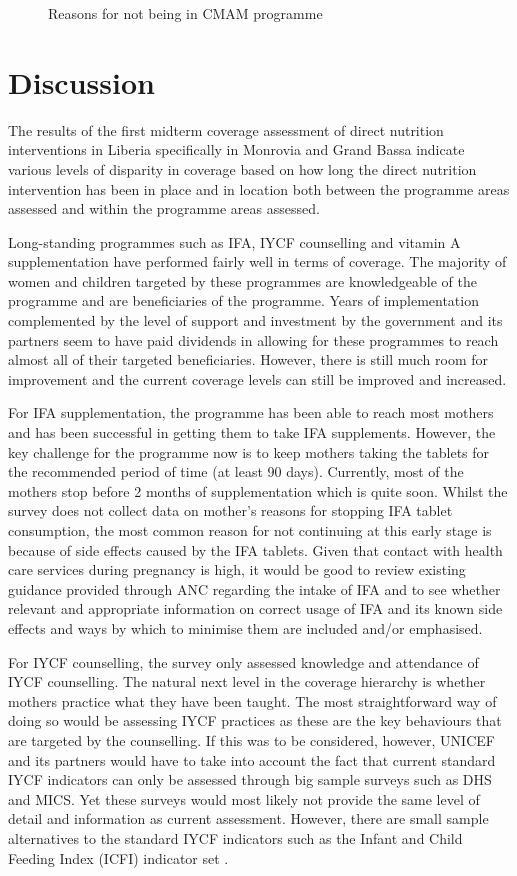 \documentclass[12pt,a4paper]{article}
\begin{document}
\begin{figure}[H]
{}

\caption{Reasons for not being in CMAM programme}\label{fig:cmam3}
\end{figure}

\hypertarget{discussion}{%
\section{Discussion}\label{discussion}}

The results of the first midterm coverage assessment of direct nutrition interventions in Liberia specifically in Monrovia and Grand Bassa indicate various levels of disparity in coverage based on how long the direct nutrition intervention has been in place and in location both between the programme areas assessed and within the programme areas assessed.

Long-standing programmes such as IFA, IYCF counselling and vitamin A supplementation have performed fairly well in terms of coverage. The majority of women and children targeted by these programmes are knowledgeable of the programme and are beneficiaries of the programme. Years of implementation complemented by the level of support and investment by the government and its partners seem to have paid dividends in allowing for these programmes to reach almost all of their targeted beneficiaries. However, there is still much room for improvement and the current coverage levels can still be improved and increased.

For IFA supplementation, the programme has been able to reach most mothers and has been successful in getting them to take IFA supplements. However, the key challenge for the programme now is to keep mothers taking the tablets for the recommended period of time (at least 90 days). Currently, most of the mothers stop before 2 months of supplementation which is quite soon. Whilst the survey does not collect data on mother's reasons for stopping IFA tablet consumption, the most common reason for not continuing at this early stage is because of side effects caused by the IFA tablets. Given that contact with health care services during pregnancy is high, it would be good to review existing guidance provided through ANC regarding the intake of IFA and to see whether relevant and appropriate information on correct usage of IFA and its known side effects and ways by which to minimise them are included and/or emphasised.

For IYCF counselling, the survey only assessed knowledge and attendance of IYCF counselling. The natural next level in the coverage hierarchy is whether mothers practice what they have been taught. The most straightforward way of doing so would be assessing IYCF practices as these are the key behaviours that are targeted by the counselling. If this was to be considered, however, UNICEF and its partners would have to take into account the fact that current standard IYCF indicators can only be assessed through big sample surveys such as DHS and MICS. Yet these surveys would most likely not provide the same level of detail and information as current assessment. However, there are small sample alternatives to the standard IYCF indicators such as the Infant and Child Feeding Index (ICFI) indicator set \citep{Guevarra:2016uw}.
\end{document}
